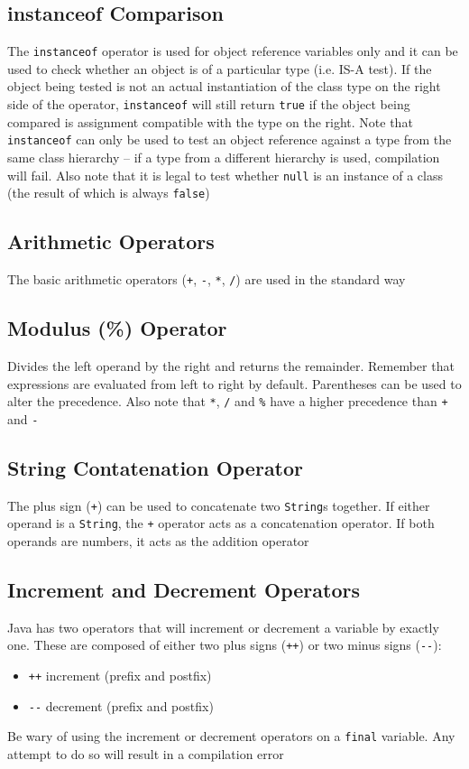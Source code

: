 \subsection{instanceof Comparison}
The \verb#instanceof# operator is used for object reference variables only and 
it can be used to check whether an object is of a particular type (i.e. IS-A 
test). If the object being tested is not an actual instantiation of the class 
type on the right side of the operator, \verb#instanceof# will still return 
\verb#true# if the object being compared is assignment compatible with the type 
on the right. Note that \verb#instanceof# can only be used to test an object 
reference against a type from the same class hierarchy -- if a type from a 
different hierarchy is used, compilation will fail. Also note that it is legal 
to test whether \verb#null# is an instance of a class (the result of which is 
always \verb#false#)

\subsection{Arithmetic Operators}
The basic arithmetic operators (\verb#+#, \verb#-#, \verb#*#, \verb#/#) are 
used in the standard way

\subsection{Modulus (\%) Operator}
Divides the left operand by the right and returns the remainder. Remember that 
expressions are evaluated from left to right by default. Parentheses can be 
used to alter the precedence. Also note that \verb#*#, \verb#/# and \verb#%# 
have a higher precedence than \verb#+# and \verb#-#

\subsection{String Contatenation Operator}
The plus sign (\verb#+#) can be used to concatenate two \verb#String#s 
together.  If either operand is a \verb#String#, the \verb#+# operator acts as 
a concatenation operator. If both operands are numbers, it acts as the addition 
operator

\subsection{Increment and Decrement Operators}
Java has two operators that will increment or decrement a variable by exactly 
one. These are composed of either two plus signs (\verb#++#) or two minus signs 
(\verb#--#):
\begin{itemize}
    \item \verb#++# increment (prefix and postfix)
    \item \verb#--# decrement (prefix and postfix)
\end{itemize}
Be wary of using the increment or decrement operators on a \verb#final# 
variable. Any attempt to do so will result in a compilation error

